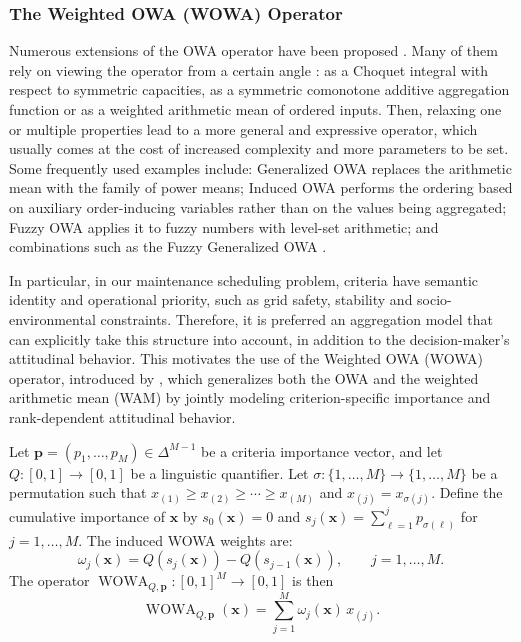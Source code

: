 \subsubsection{The Weighted OWA (WOWA) Operator}
Numerous extensions of the OWA operator have been proposed \cite{SurveyEmrouznejad2014}. Many of them rely on viewing the operator from a certain angle \cite{OWAFramework}: as a Choquet integral with respect to symmetric capacities, as a symmetric comonotone additive aggregation function or as a weighted arithmetic mean of ordered inputs. Then, relaxing one or multiple properties lead to a more general and expressive operator, which usually comes at the cost of increased complexity and more parameters to be set. Some frequently used examples include: Generalized OWA \cite{GOWA} replaces the arithmetic mean with the family of power means; Induced OWA \cite{IOWA} performs the ordering based on auxiliary order-inducing variables rather than on the values being aggregated; Fuzzy OWA \cite{FOWA} applies it to fuzzy numbers with level-set arithmetic; and combinations such as the Fuzzy Generalized OWA \cite{FGOWA}.

In particular, in our maintenance scheduling problem, criteria have semantic identity and operational priority, such as grid safety, stability and socio-environmental constraints. Therefore, it is preferred an aggregation model that can explicitly take this structure into account, in addition to the decision-maker's attitudinal behavior. This motivates the use of the Weighted OWA (WOWA) operator, introduced by \citet{WOWA}, which generalizes both the OWA and the weighted arithmetic mean (WAM) by jointly modeling criterion-specific importance and rank-dependent attitudinal behavior.

\begin{definition}
Let $\mathbf{p}=(p_1,\dots,p_M)\in\Delta^{M-1}$ be a criteria importance vector, and let $Q:[0,1]\to[0,1]$ be a linguistic quantifier. Let $\sigma:\{1,\dots,M\}\to\{1,\dots,M\}$ be a permutation such that $x_{(1)}\ge x_{(2)}\ge\cdots\ge x_{(M)}$ and $x_{(j)}=x_{\sigma(j)}$. Define the cumulative importance of $\mathbf{x}$ by $s_0(\mathbf{x})=0$ and $s_j(\mathbf{x})=\sum_{\ell=1}^{j}p_{\sigma(\ell)}$ for $j=1,\dots,M$. The induced WOWA weights are:
\begin{equation}
\label{eq:wowa_weights}
			\omega_j(\mathbf{x})=Q\!\left(s_j(\mathbf{x})\right)-Q\!\left(s_{j-1}(\mathbf{x})\right),\qquad j=1,\dots,M.
\end{equation}
		The operator $\operatorname{WOWA}_{Q,\mathbf{p}}: [0,1]^M \to [0,1]$ is then
		\[
			\operatorname{WOWA}_{Q,\mathbf{p}}(\mathbf{x})=\sum_{j=1}^{M}\omega_j(\mathbf{x})\,x_{(j)}.
		\]
\end{definition}

